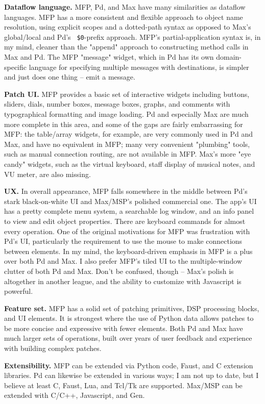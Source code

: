 \documentclass[a4paper]{article}
\begin{document}
{\bf Dataflow language.} MFP, Pd, and Max have many similarities
as dataflow languages. MFP has a more consistent and flexible
approach to object name resolution, using explicit scopes and a
dotted-path syntax as opposed to Max's global/local and Pd's {\tt
\$0}-prefix approach. MFP's partial-application syntax is, in my
mind, cleaner than the "append" approach to constructing method
calls in Max and Pd. The MFP "message" widget, which in Pd has
its own domain-specific language for specifying multiple messages
with destinations, is simpler and just does one thing -- emit a
message.

{\bf Patch UI.} MFP provides a basic set of interactive widgets
including buttons, sliders, dials, number boxes, message boxes,
graphs, and comments with typographical formatting and image
loading. Pd and especially Max are much more complete in this
area, and some of the gaps are fairly embarrassing for MFP: the
table/array widgets, for example, are very commonly used in Pd
and Max, and have no equivalent in MFP; many very convenient
"plumbing" tools, such as manual connection routing, are not
available in MFP. Max's more "eye candy" widgets, such as the
virtual keyboard, staff display of musical notes, and VU meter,
are also missing.

{\bf UX.} In overall appearance, MFP falls somewhere in the
middle between Pd's stark black-on-white UI and Max/MSP's
polished commercial one. The app's UI has a pretty complete menu
system, a searchable log window, and an info panel to view and
edit object properties. There are keyboard commands for almost
every operation. One of the original motivations for MFP was
frustration with Pd's UI, particularly the requirement to use the
mouse to make connections between elements. In my mind, the
keyboard-driven emphasis in MFP is a plus over both Pd and Max. I
also prefer MFP's tiled UI to the multiple-window clutter of both
Pd and Max. Don't be confused, though -- Max's polish is
altogether in another league, and the ability to customize with
Javascript is powerful.

{\bf Feature set.} MFP has a solid set of patching primitives,
DSP processing blocks, and UI elements. It is strongest where the
use of Python data allows patches to be more concise and
expressive with fewer elements. Both Pd and Max have much larger
sets of operations, built over years of user feedback and
experience with building complex patches.

{\bf Extensibility.} MFP can be extended via Python code, Faust,
and C extension libraries. Pd can likewise be extended in various
ways; I am not up to date, but I believe at least C, Faust, Lua,
and Tcl/Tk are supported. Max/MSP can be extended with C/C++,
Javascript, and Gen.
\end{document}
